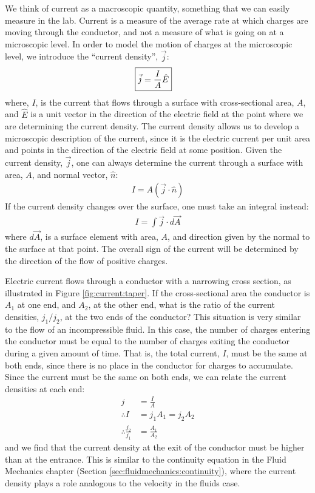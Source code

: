 We think of current as a macroscopic quantity, something that we can easily measure in the lab. Current is a measure of the average rate at which charges are moving through the conductor, and not a measure of what is going on at a microscopic level. In order to model the motion of charges at the microscopic level, we introduce the ``current density'', $\vec j$:
\begin{align*}
\Aboxed{\vec j = \frac{I}{A}\hat E}
\end{align*}
where, $I$, is the current that flows through a surface with cross-sectional area, $A$, and $\hat E$ is a unit vector in the direction of the electric field at the point where we are determining the current density. The current density allows us to develop a microscopic description of the current, since it is the electric current per unit area and points in the direction of the electric field at some position. Given the current density, $\vec j$, one can always determine the current through a surface with area, $A$, and normal vector, $\hat n$:
\begin{align*}
I = A(\vec j\cdot \hat n)
\end{align*}
If the current density changes over the surface, one must take an integral instead:
\begin{align*}
I=\int \vec j \cdot d\vec A
\end{align*}
where $d\vec A$, is a surface element with area, $A$, and direction given by the normal to the surface at that point. The overall sign of the current will be determined by the direction of the flow of positive charges.

\begin{example}{Electric current flows through a conductor with a narrowing cross section, as illustrated in Figure \ref{fig:current:taper}. If the cross-sectional area the conductor is $A_1$ at one end, and $A_2$, at the other end, what is the ratio of the current densities, $j_1/j_2$, at the two ends of the conductor?}
This situation is very similar to the flow of an incompressible fluid. In this case, the number of charges entering the conductor must be equal to the number of charges exiting the conductor during a given amount of time. That is, the total current, $I$, must be the same at both ends, since there is no place in the conductor for charges to accumulate. Since the current must be the same on both ends, we can relate the current densities at each end:
\begin{align*}
j&=\frac{I}{A}\\
\therefore I&=j_1A_1=j_2A_2\\
\therefore \frac{j_2}{j_1}&=\frac{A_1}{A_2}
\end{align*}
and we find that the current density at the exit of the conductor must be higher than at the entrance. This is similar to the continuity equation in the Fluid Mechanics chapter (Section \ref{sec:fluidmechanics:continuity}), where the current density plays a role analogous to the velocity in the fluids case. 
\end{example}

